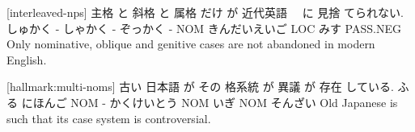 [interleaved-nps]
主格    と 斜格   と 属格    だけ が 近代英語　     に  見捨 てられない.
しゅかく - しゃかく - ぞっかく -  NOM きんだいえいご LOC みす PASS.NEG
Only nominative, oblique and genitive cases are not abandoned in modern English.

[hallmark:multi-noms]
古い 日本語   が  その 格系統     が   異議 が  存在 している.
ふる にほんご NOM -   かくけいとう NOM いぎ NOM そんざい
Old Japanese is such that its case system is controversial.
